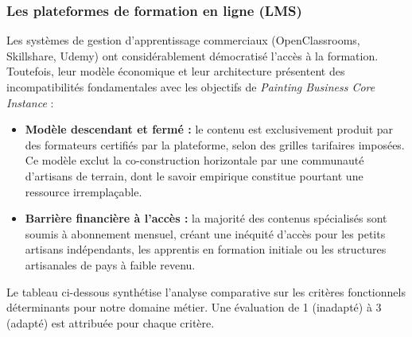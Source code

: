 \documentclass[12pt,a4paper]{report}
\begin{document}
\subsubsection*{Les plateformes de formation en ligne (LMS)}

\noindent
Les systèmes de gestion d'apprentissage commerciaux (OpenClassrooms, Skillshare, Udemy) ont considérablement démocratisé l'accès à la formation. Toutefois, leur modèle économique et leur architecture présentent des incompatibilités fondamentales avec les objectifs de \textit{Painting Business Core Instance} :

\begin{itemize}[leftmargin=1.5cm, itemsep=4pt]
    \item \textbf{Modèle descendant et fermé :} le contenu est exclusivement produit par des formateurs certifiés par la plateforme, selon des grilles tarifaires imposées. Ce modèle exclut la co-construction horizontale par une communauté d'artisans de terrain, dont le savoir empirique constitue pourtant une ressource irremplaçable.
    \item \textbf{Barrière financière à l'accès :} la majorité des contenus spécialisés sont soumis à abonnement mensuel, créant une inéquité d'accès pour les petits artisans indépendants, les apprentis en formation initiale ou les structures artisanales de pays à faible revenu.
\end{itemize}

\vspace{0.8em}
\begin{insightbox}
Le tableau ci-dessous synthétise l'analyse comparative sur les critères fonctionnels déterminants pour notre domaine métier. Une évaluation de 1 (inadapté) à 3 (adapté) est attribuée pour chaque critère.
\end{insightbox}
\end{document}

